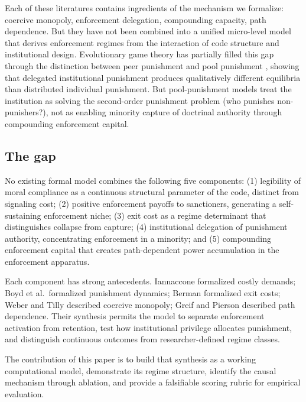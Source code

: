 \documentclass[12pt]{article}
\begin{document}
Each of these literatures contains ingredients of the mechanism we formalize: coercive monopoly, enforcement delegation, compounding capacity, path dependence. But they have not been combined into a unified micro-level model that derives enforcement regimes from the interaction of code structure and institutional design. Evolutionary game theory has partially filled this gap through the distinction between peer punishment and pool punishment \cite{hilbe2014,sigmund2010}, showing that delegated institutional punishment produces qualitatively different equilibria than distributed individual punishment. But pool-punishment models treat the institution as solving the second-order punishment problem (who punishes non-punishers?), not as enabling minority capture of doctrinal authority through compounding enforcement capital.

\subsection{The gap}

No existing formal model combines the following five components: (1) legibility of moral compliance as a continuous structural parameter of the code, distinct from signaling cost; (2) positive enforcement payoffs to sanctioners, generating a self-sustaining enforcement niche; (3) exit cost as a regime determinant that distinguishes collapse from capture; (4) institutional delegation of punishment authority, concentrating enforcement in a minority; and (5) compounding enforcement capital that creates path-dependent power accumulation in the enforcement apparatus.

Each component has strong antecedents. Iannaccone formalized costly demands; Boyd et al.\ formalized punishment dynamics; Berman formalized exit costs; Weber \cite{weber1946} and Tilly \cite{tilly1985} described coercive monopoly; Greif and Pierson described path dependence. Their synthesis permits the model to separate enforcement activation from retention, test how institutional privilege allocates punishment, and distinguish continuous outcomes from researcher-defined regime classes.

The contribution of this paper is to build that synthesis as a working computational model, demonstrate its regime structure, identify the causal mechanism through ablation, and provide a falsifiable scoring rubric for empirical evaluation.


\end{document}
